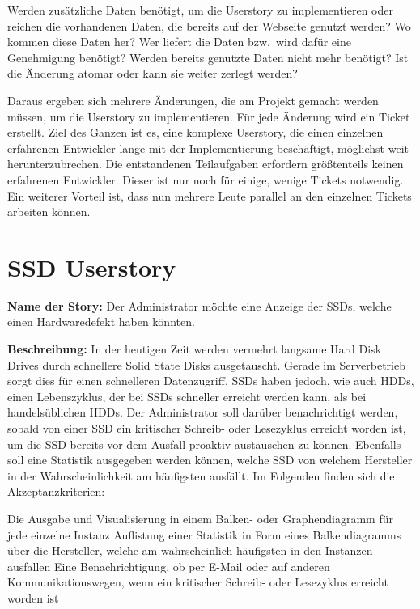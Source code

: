 {\begin{outline}
  \1 Werden zusätzliche Daten benötigt, um die Userstory zu implementieren oder
  reichen die vorhandenen Daten, die bereits auf der Webseite genutzt werden?
  \1 Wo kommen diese Daten her?
  \1 Wer liefert die Daten bzw.\ wird dafür eine Genehmigung benötigt?
  \1 Werden bereits genutzte Daten nicht mehr benötigt?
  \1 Ist die Änderung atomar oder kann sie weiter zerlegt werden?
\end{outline}

Daraus ergeben sich mehrere Änderungen, die am Projekt gemacht werden müssen,
um die Userstory zu implementieren. Für jede Änderung wird ein Ticket erstellt.
Ziel des Ganzen ist es, eine komplexe Userstory, die einen einzelnen erfahrenen
Entwickler lange mit der Implementierung beschäftigt, möglichst weit
herunterzubrechen. Die entstandenen Teilaufgaben erfordern größtenteils keinen
erfahrenen Entwickler. Dieser ist nur noch für einige, wenige Tickets
notwendig.  Ein weiterer Vorteil ist, dass nun mehrere Leute parallel an den
einzelnen Tickets arbeiten können.
\tm%

\section{SSD Userstory}
\textbf{Name der Story:} Der Administrator möchte eine Anzeige der SSDs, welche
einen Hardwaredefekt haben könnten.

\textbf{Beschreibung:} In der heutigen Zeit werden vermehrt langsame Hard Disk
Drives durch schnellere Solid State Disks ausgetauscht. Gerade im Serverbetrieb
sorgt dies für einen schnelleren Datenzugriff. SSDs haben jedoch, wie auch
HDDs, einen Lebenszyklus, der bei SSDs schneller erreicht werden kann, als bei
handelsüblichen HDDs. Der Administrator soll darüber benachrichtigt
werden, sobald von einer SSD ein kritischer Schreib- oder Lesezyklus erreicht
worden ist, um die SSD bereits vor dem Ausfall proaktiv austauschen zu können.
Ebenfalls soll eine Statistik ausgegeben werden können, welche SSD von welchem
Hersteller in der Wahrscheinlichkeit am häufigsten ausfällt. Im Folgenden
finden sich die Akzeptanzkriterien:

\begin{outline}
  \1 Die Ausgabe und Visualisierung in einem Balken- oder Graphendiagramm
  für jede einzelne Instanz
  \1 Auflistung einer Statistik in Form eines Balkendiagramms über die
  Hersteller, welche am wahrscheinlich häufigsten in den Instanzen ausfallen
  \1 Eine Benachrichtigung, ob per E\hyp{}Mail oder auf anderen
  Kommunikationswegen, wenn ein kritischer Schreib- oder Lesezyklus erreicht
  worden ist
\end{outline}

}
